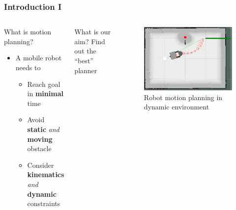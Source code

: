 \documentclass{beamer}
\begin{document}
\begin{frame}
    \frametitle{\huge{Introduction I}}
    \begin{columns}[t]
        \begin{block}{What is motion planning?}
            \begin{itemize}
                \item A mobile robot needs to 
                    \begin{itemize}
                        \item Reach goal in \textbf{minimal} time
                        \item Avoid \textbf{static} \textit{and} \textbf{moving} obstacle
                        \item Consider \textbf{kinematics} \textit{and} \textbf{dynamic} 
                            constraints
                    \end{itemize}
            \end{itemize}
        \end{block}
        \begin{block}{What is our aim?}
            Find out the ``best'' planner
        \end{block}
        \begin{figure}[htpb]
            \centering
            \includegraphics[width=1.0\textwidth]{intro.png}
            \caption{Robot motion planning in dynamic environment}
            \label{fig:intro}
        \end{figure}
    \end{columns}
\end{frame}
\end{document}
